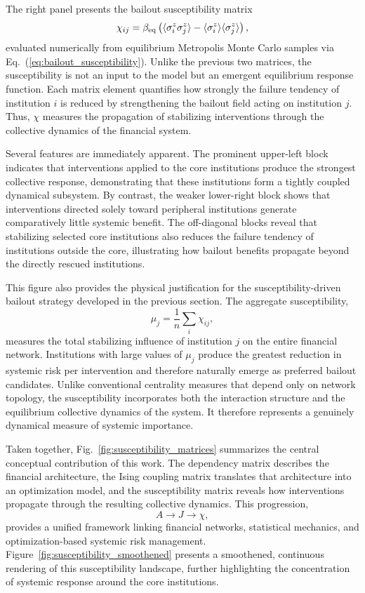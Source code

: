 \documentclass[aps,reprint,superscriptaddress,pra]{revtex4-2}
\begin{document}
The right panel presents the bailout susceptibility matrix
\begin{equation*}
\chi_{ij} = \beta_{\rm eq}\left(\langle\sigma_i^z\sigma_j^z\rangle - \langle\sigma_i^z\rangle\langle\sigma_j^z\rangle\right),
\end{equation*}
evaluated numerically from equilibrium Metropolis Monte Carlo samples via  Eq.~(\ref{eq:bailout_susceptibility}). Unlike the previous two matrices, the susceptibility is not an input to the model but an emergent equilibrium response function. Each matrix element quantifies how strongly the failure tendency of institution $i$ is reduced by strengthening the bailout field acting on institution $j$. Thus, $\chi$ measures the propagation of stabilizing interventions through the collective dynamics of the financial system.

Several features are immediately apparent. The prominent upper-left block indicates that interventions applied to the core institutions produce the strongest collective response, demonstrating that these institutions form a tightly coupled dynamical subsystem. By contrast, the weaker lower-right block shows that interventions directed solely toward peripheral institutions generate comparatively little systemic benefit. The off-diagonal blocks reveal that stabilizing selected core institutions also reduces the failure tendency of institutions outside the core, illustrating how bailout benefits propagate beyond the directly rescued institutions.

This figure also provides the physical justification for the susceptibility-driven bailout strategy developed in the previous section. The aggregate susceptibility,
\[
\mu_j
=
\frac{1}{n}
\sum_i
\chi_{ij},
\]
measures the total stabilizing influence of institution $j$ on the entire financial network. Institutions with large values of $\mu_j$ produce the greatest reduction in systemic risk per intervention and therefore naturally emerge as preferred bailout candidates. Unlike conventional centrality measures that depend only on network topology, the susceptibility incorporates both the interaction structure and the equilibrium collective dynamics of the system. It therefore represents a genuinely dynamical measure of systemic importance.

Taken together, Fig.~\ref{fig:susceptibility_matrices} summarizes the central conceptual contribution of this work. The dependency matrix describes the financial architecture, the Ising coupling matrix translates that architecture into an optimization model, and the susceptibility matrix reveals how interventions propagate through the resulting collective dynamics. This progression,
\[
A
\rightarrow
J
\rightarrow
\chi,
\]
provides a unified framework linking financial networks, statistical mechanics, and optimization-based systemic risk management. Figure~\ref{fig:susceptibility_smoothened} presents a smoothened, continuous rendering of this susceptibility landscape, further highlighting the concentration of systemic response around the core institutions.
\end{document}
